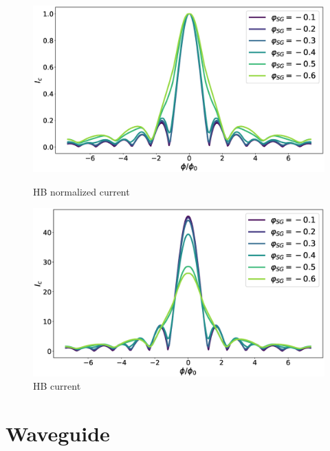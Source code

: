 \begin{figure}[ht]
\begin{minipage}[b]{0.49\linewidth}
\centering
\includegraphics[width=\textwidth]{figure/numericalmodel/hb_upper}
\caption{HB normalized current } \label{fig:hb-norm}
\end{minipage}
\begin{minipage}[b]{0.49\linewidth}
\centering
\includegraphics[width=\textwidth]{figure/numericalmodel/hb_upper_abs}
\caption{HB current}\label{fig:hb-abs}
\end{minipage}
\end{figure}


\section{Waveguide}

